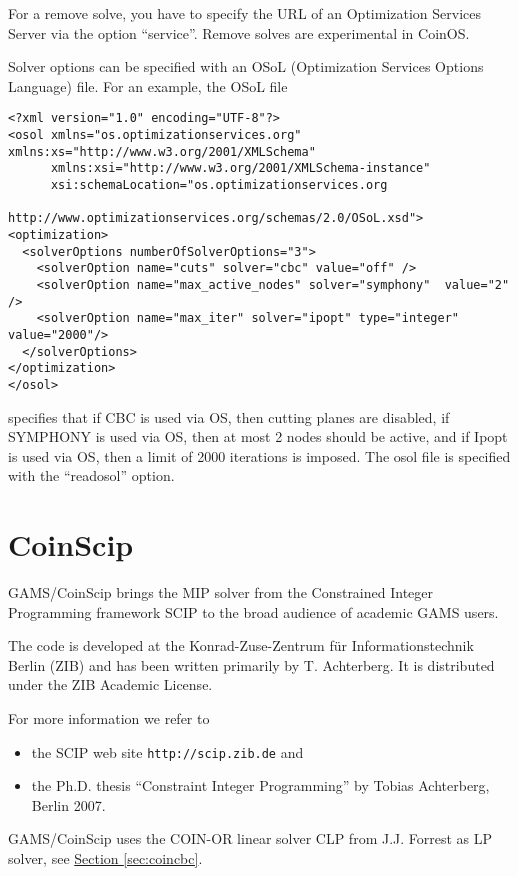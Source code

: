 For a remove solve, you have to specify the URL of an Optimization Services Server via the option ``service''.
Remove solves are experimental in CoinOS.

Solver options can be specified with an OSoL (Optimization Services Options Language) file.
For an example, the OSoL file
\begin{verbatim}
<?xml version="1.0" encoding="UTF-8"?>
<osol xmlns="os.optimizationservices.org" xmlns:xs="http://www.w3.org/2001/XMLSchema"
      xmlns:xsi="http://www.w3.org/2001/XMLSchema-instance"
      xsi:schemaLocation="os.optimizationservices.org
                          http://www.optimizationservices.org/schemas/2.0/OSoL.xsd">
<optimization>
  <solverOptions numberOfSolverOptions="3">
    <solverOption name="cuts" solver="cbc" value="off" />
    <solverOption name="max_active_nodes" solver="symphony"  value="2" />
    <solverOption name="max_iter" solver="ipopt" type="integer" value="2000"/> 
  </solverOptions>
</optimization>
</osol>
\end{verbatim}
specifies that if CBC is used via OS, then cutting planes are disabled,
if SYMPHONY is used via OS, then at most 2 nodes should be active,
and if Ipopt is used via OS, then a limit of 2000 iterations is imposed.
The osol file is specified with the ``readosol'' option.



\section{CoinScip}

GAMS/CoinScip brings the MIP solver from the Constrained Integer Programming framework SCIP to the broad audience of academic GAMS users.

The code is developed at the Konrad-Zuse-Zentrum f\"ur Informationstechnik Berlin (ZIB) and has been written primarily by T. Achterberg.
It is distributed under the ZIB Academic License.

For more information we refer to
\begin{itemize}
\item the SCIP web site \texttt{http://scip.zib.de} and
\item the Ph.D. thesis ``Constraint Integer Programming'' by Tobias Achterberg, Berlin 2007.
\end{itemize}

GAMS/CoinScip uses the COIN-OR linear solver CLP from J.J. Forrest as LP solver, see \hyperlink{sec:coincbc}{Section \ref{sec:coincbc}}.

